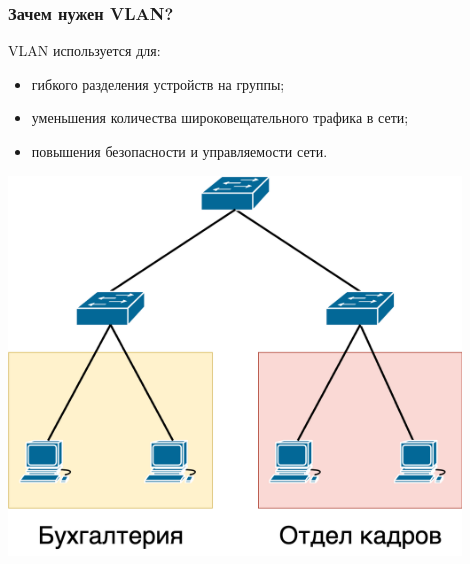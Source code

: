 \documentclass[aspectratio=169]{beamer}
\begin{document}
\begin{frame}
  \frametitle{Зачем нужен VLAN?}

  \begin{minipage}{0.45\textwidth}
    VLAN используется для:
    \vspace*{1em}
    \begin{itemize}
      \item гибкого разделения устройств на группы;
      \item уменьшения количества широковещательного трафика в сети;
      \item повышения безопасности и управляемости сети.
    \end{itemize}
  \end{minipage}
  \hspace*{1em}
  \begin{minipage}{0.45\textwidth}
    \centering
    \includegraphics[width=0.9\textwidth]{images/vlan-example.png}
  \end{minipage}
\end{frame}
\end{document}
